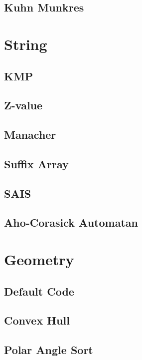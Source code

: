 \subsection{Kuhn Munkres}


\section{String}
\subsection{KMP}

\subsection{Z-value}

\subsection{Manacher}

\subsection{Suffix Array}

\subsection{SAIS}

\subsection{Aho-Corasick Automatan}


\section{Geometry}
\subsection{Default Code}

\subsection{Convex Hull}

\subsection{Polar Angle Sort}

